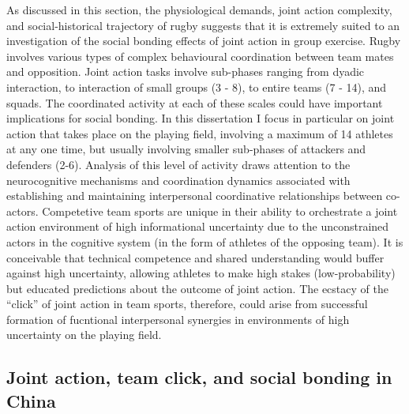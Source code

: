 {As discussed in this section, the physiological demands, joint action complexity, and social-historical trajectory of rugby suggests that it is extremely suited to an investigation of the social bonding effects of joint action in group exercise.  Rugby involves various types of complex behavioural coordination between team mates and opposition.  Joint action tasks involve sub-phases ranging from dyadic interaction, to interaction of small groups (3 - 8), to entire teams (7 - 14), and squads.  The coordinated activity at each of these scales could have important implications for social bonding.  In this dissertation I focus in particular on joint action that takes place on the playing field, involving a maximum of 14 athletes at any one time, but usually involving smaller sub-phases of attackers and defenders (2-6).  Analysis of this level of activity draws attention to the neurocognitive mechanisms and coordination dynamics associated with establishing and maintaining interpersonal coordinative relationships between co-actors.  Competetive team sports are unique in their ability to orchestrate a joint action environment of high informational uncertainty due to the unconstrained actors in the cognitive system (in the form of athletes of the opposing team).  It is conceivable that technical competence and shared understanding would buffer against high uncertainty, allowing athletes to make high stakes (low-probability) but educated predictions about the outcome of joint action.  The ecstacy of the ``click'' of joint action in team sports, therefore, could arise from successful formation of fucntional interpersonal synergies in environments of high uncertainty on the playing field.



  \subsection{Joint action, team click, and social bonding in China}

}
